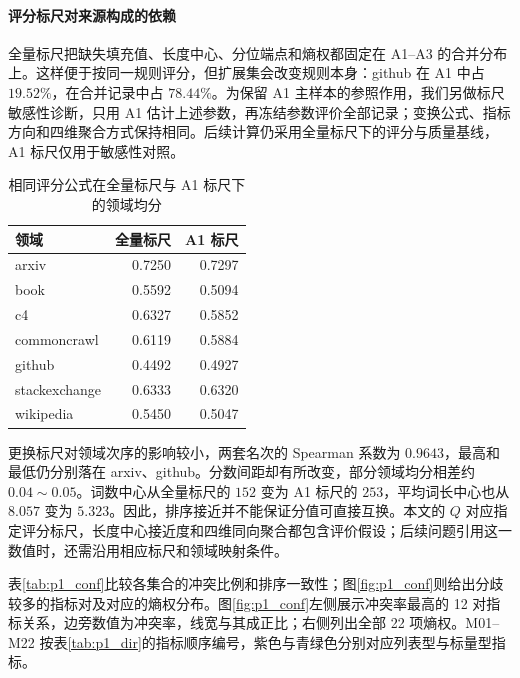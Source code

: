 \paragraph{评分标尺对来源构成的依赖}
全量标尺把缺失填充值、长度中心、分位端点和熵权都固定在 A1--A3 的合并分布上。这样便于按同一规则评分，但扩展集会改变规则本身：github 在 A1 中占 $19.52\%$，在合并记录中占 $78.44\%$。为保留 A1 主样本的参照作用，我们另做标尺敏感性诊断，只用 A1 估计上述参数，再冻结参数评价全部记录；变换公式、指标方向和四维聚合方式保持相同。后续计算仍采用全量标尺下的评分与质量基线，A1 标尺仅用于敏感性对照。

\begin{table}[htbp]
\centering
\caption{相同评分公式在全量标尺与 A1 标尺下的领域均分}
\label{tab:q1_review_calibration}
\begin{tabular}{@{}lrr@{}}
\toprule
领域 & 全量标尺 & A1 标尺 \\
\midrule
arxiv & 0.7250 & 0.7297 \\
book & 0.5592 & 0.5094 \\
c4 & 0.6327 & 0.5852 \\
commoncrawl & 0.6119 & 0.5884 \\
github & 0.4492 & 0.4927 \\
stackexchange & 0.6333 & 0.6320 \\
wikipedia & 0.5450 & 0.5047 \\
\bottomrule
\end{tabular}
\end{table}

更换标尺对领域次序的影响较小，两套名次的 Spearman 系数为 $0.9643$，最高和最低仍分别落在 arxiv、github。分数间距却有所改变，部分领域均分相差约 $0.04\sim0.05$。词数中心从全量标尺的 $152$ 变为 A1 标尺的 $253$，平均词长中心也从 $8.057$ 变为 $5.323$。因此，排序接近并不能保证分值可直接互换。本文的 $Q$ 对应指定评分标尺，长度中心接近度和四维同向聚合都包含评价假设；后续问题引用这一数值时，还需沿用相应标尺和领域映射条件。

表\ref{tab:p1_conf}比较各集合的冲突比例和排序一致性；图\ref{fig:p1_conf}则给出分歧较多的指标对及对应的熵权分布。图\ref{fig:p1_conf}左侧展示冲突率最高的 12 对指标关系，边旁数值为冲突率，线宽与其成正比；右侧列出全部 22 项熵权。M01--M22 按表\ref{tab:p1_dir}的指标顺序编号，紫色与青绿色分别对应列表型与标量型指标。

